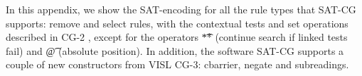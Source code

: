\def\sobre{\text{\em sobre}}
\def\una{\text{\em una}}
\def\aproximacion{\text{ \em aproximaci\'{o}n}}
\def\mas{\text{\em m\'{a}s}}
\def\cientifica{\text{\em cient\'{\i}fica}}


\def\vPrsPThree{\text{\sc PrsP3}}
\def\vPrsPOne{\text{\sc PrsP1}}
\def\vImpPThree{\text{\sc ImpP3}}
\def\adj{{\text{\sc Adj}}}
\def\adv{{\text{\sc Adv}}}
\def\n{\text{\sc N}}
\def\pr{{\text{\sc Pr}}}
\def\prn{{\text{\sc Prn}}}
\def\det{{\text{\sc Det}}}
\def\notDet{{\neg \text{\sc Det}}}
\def\any{{\text{Any}}}


\def\sobrePr{\sobre_\pr}
\def\sobreN{\sobre_\n}

\def\unaNotDet{\una_\notDet}
\def\unaAny{\una_\any}
\def\unaPrn{\una_\prn}
\def\unaDet{\una_\det}
\def\unaPrsPThree{\una_\vPrsPThree}
\def\unaPrsPOne{\una_\vPrsPOne}
\def\unaImp{\una_\vImpPThree}
\def\aproximacionN{\aproximacion_\n}
\def\masAdv{\mas_\adv}
\def\masAdj{\mas_\adj}
\def\cientificaAdj{\cientifica_\adj}
\def\cientificaN{\cientifica_\n}


\def\newVar{\text{}} %

\def\cgrule#1{\noindent {\bf  #1 }}
\def\eqdef{\Coloneqq}
\def\impl{\quad\Longrightarrow\quad}

\def\ob#1{\overbrace{ #1 \rule{0pt}{2ex}}}






\label{appendix1}

\noindent In this appendix, we show the SAT-encoding for all the rule types that 
SAT-CG supports: 
{\sc remove} and {\sc select} rules, with the contextual tests and set operations described in CG-2 \cite{tapanainen1996}, except for the operators \t{**} (continue search if linked tests fail) and \t{@} (absolute position). In addition, the software SAT-CG supports a couple of new constructors from VISL CG-3: {\sc cbarrier}, {\sc negate} and subreadings.

